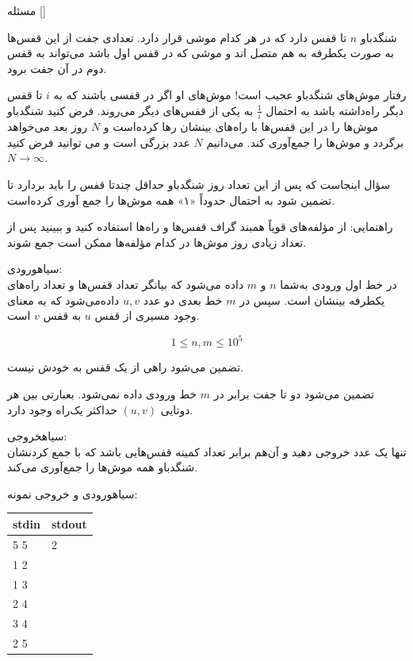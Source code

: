

‌مسئله []

شنگدباو $n$ تا قفس دارد که در هر کدام موشی قرار دارد. تعدادی جفت از این قفس‌ها به صورت یکطرفه به هم متصل اند و موشی که در قفس اول باشد می‌تواند به قفس دوم در آن جفت برود. 

رفتار موش‌های شنگدباو عجیب است! موش‌های او اگر در قفسی باشند که به $i$ تا قفس دیگر راه‌داشته باشد به احتمال 
$\frac{1}{i}$
به یکی از قفس‌های دیگر می‌روند. فرض کنید شنگدباو موش‌ها را در این قفس‌ها با راه‌های بینشان رها کرده‌است و $N$ روز بعد می‌خواهد برگردد و موش‌ها را جمع‌آوری کند. می‌دانیم $N$ عدد بزرگی است و می ‌توانید فرض کنید
$N \to \infty$.

سؤال اینجاست که پس از این تعداد روز شنگدباو حداقل چند‌تا قفس را باید بردارد تا تضمین شود به احتمال حدوداً «۱» همه موش‌ها را جمع آوری کرده‌است.

راهنمایی: از مؤلفه‌های قویاً همبند گراف قفس‌ها و راه‌ها استفاده کنید و ببینید پس از تعداد زیادی روز موش‌ها در کدام مؤلفه‌ها ممکن است جمع شوند.

‌سیاه{ورودی:}\\
در خط اول ورودی به‌شما $n$ و $m$ داده می‌شود که بیانگر تعداد قفس‌ها و تعداد راه‌های یکطرفه بینشان است. سپس در $m$ خط بعدی دو عدد $u, v$ داده‌می‌شود که به معنای وجود مسیری از قفس $u$ به قفس $v$ است.

$$1 \le n, m \le 10^5$$

تضمین می‌شود راهی از یک قفس به خودش نیست. 

تضمین می‌شود دو تا جفت برابر در $m$ خط ورودی داده‌ نمی‌شود. بعبارتی بین هر دوتایی 
$(u, v)$
حداکثر یک‌راه وجود دارد.

‌سیاه{خروجی:}\\
تنها یک عدد خروجی دهید و آن‌هم برابر تعداد کمینه‌ قفس‌هایی باشد که با جمع کردنشان شنگدباو همه موش‌ها را جمع‌آوری می‌کند.

‌سیاه{ورودی و خروجی نمونه:}\\

\begin{latin}
	\begin{tabularx}{\textwidth}{|X | X|}
		\hline
		\textbf{stdin} &
		\textbf{stdout}\\
		\hline
		5 5 & 2\\
		1 2 &\\
		1 3& \\
		2 4&\\
		3 4&\\
		2 5&\\
		\hline
	\end{tabularx}
\end{latin}

